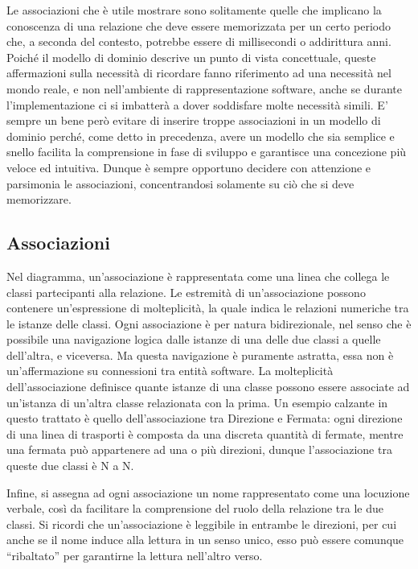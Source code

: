 Le associazioni che è utile mostrare sono solitamente quelle che implicano la conoscenza di una relazione che deve essere memorizzata per un certo periodo che, a seconda del contesto, potrebbe essere di millisecondi o addirittura anni.
Poiché il modello di dominio descrive un punto di vista concettuale, queste affermazioni sulla necessità di ricordare fanno riferimento ad una necessità nel mondo reale, e non nell'ambiente di rappresentazione software, anche se durante l'implementazione ci si imbatterà a dover soddisfare molte necessità simili.
E' sempre un bene però evitare di inserire troppe associazioni in un modello di dominio perché, come detto in precedenza, avere un modello che sia semplice e snello facilita la comprensione in fase di sviluppo e garantisce una concezione più veloce ed intuitiva. Dunque è sempre opportuno decidere con attenzione e parsimonia le associazioni, concentrandosi solamente su ciò che si deve memorizzare.

\subsection{Associazioni} %
\label{sub:associazioni}

Nel diagramma, un'associazione è rappresentata come una linea che collega le classi partecipanti alla relazione. Le estremità di un'associazione possono contenere un'espressione di molteplicità, la quale indica le relazioni numeriche tra le istanze delle classi.
Ogni associazione è per natura bidirezionale, nel senso che è possibile una navigazione logica dalle istanze di una delle due classi a quelle dell'altra, e viceversa. Ma questa navigazione è puramente astratta, essa non è un'affermazione su connessioni tra entità software.
La molteplicità dell'associazione definisce quante istanze di una classe possono essere associate ad un'istanza di un'altra classe relazionata con la prima.
Un esempio calzante in questo trattato è quello dell'associazione tra Direzione e Fermata: ogni direzione di una linea di trasporti è composta da una discreta quantità di fermate, mentre una fermata può appartenere ad una o più direzioni, dunque l'associazione tra queste due classi è N a N.

Infine, si assegna ad ogni associazione un nome rappresentato come una locuzione verbale, così da facilitare la comprensione del ruolo della relazione tra le due classi. Si ricordi che un'associazione è leggibile in entrambe le direzioni, per cui anche se il nome induce alla lettura in un senso unico, esso può essere comunque ``ribaltato'' per garantirne la lettura nell'altro verso.

